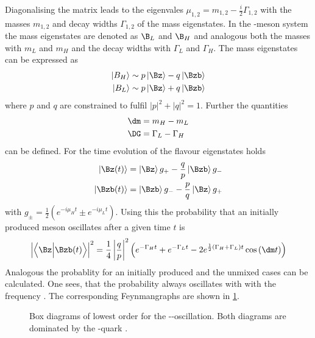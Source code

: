 Diagonalising the matrix leads to the eigenvales $\mu_{1,2}=m_{1,2}-\frac{i}{2}\Gamma_{1,2}$ with the masses $m_{1,2}$ and decay widths
$\Gamma_{1,2}$  of the mass eigenstates. In the \Bz-meson system the mass eigenstates are denoted as $\B_L$ and $\B_H$ and
analogous both the masses with $m_L$ and $m_H$ and the decay widths with $\Gamma_L$ and $\Gamma_H$. The mass eigenstates
can be expressed as
\begin{equation}
\begin{split}
\left|B_H\right>&\sim p\left|\Bz\right>-q\left|\Bzb\right>\\
\left|B_L\right>&\sim p\left|\Bz\right>+q\left|\Bzb\right>
\end{split}
\end{equation}
where $p$ and $q$ are constrained to fulfil $\left|p\right|^2+\left|q\right|^2=1$. Further the quantities
\begin{align}
\dm&=m_H-m_L\\
\DG&=\Gamma_L-\Gamma_H
\end{align}
can be defined. For the time evolution of the flavour eigenstates holds
\begin{equation}
\begin{split}
\left|\Bz\!\left(t\right)\right>&=\left|\Bz\right>g_+-\frac{q}{p}\left|\Bzb\right>g_-\\
\left|\Bzb\!\left(t\right)\right>&=\left|\Bzb\right>g_--\frac{p}{q}\left|\Bz\right>g_+
\end{split}
\end{equation}
with $g_\pm=\frac{1}{2}\left(e^{-i\mu_Ht}\pm e^{-i\mu_Lt}\right)$. Using this the probability that an initially produced
\Bz meson oscillates after a given time $t$ is
\begin{equation}
\left|\left<\Bz\Big|\Bzb\!\left(t\right)\right>\right|^2=\frac{1}{4}\left|\frac{q}{p}\right|^2
\left(e^{-\Gamma_Ht}+e^{-\Gamma_Lt}-2e^{\frac{1}{2}\left(\Gamma_H+\Gamma_L\right)t}\cos\left(\dm t\right)\right)
\end{equation}
Analogous the probablity for an initially produced \Bzb and the unmixed cases can be calculated. One sees, that the probability
always oscillates with with the frequency \dm. The corresponding Feynmangraphs are shown in \cref{fig:FeynmanMixing}.

\begin{figure}[tbp]
	\centering
	
	\hspace{0.5cm}
	
	\caption{Box diagrams of lowest order for the \Bz-\Bzb-oscillation. Both diagrams are dominated by the \tquark-quark \cite{Ellis:2016jkw}.}
	\label{fig:FeynmanMixing}
\end{figure}

